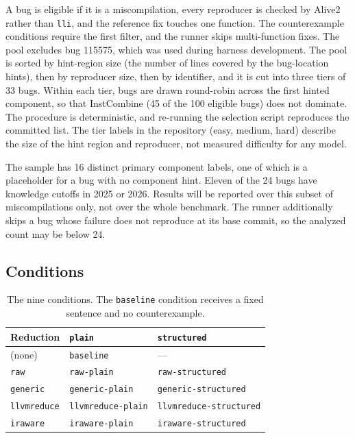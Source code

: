 \documentclass[conference]{IEEEtran}
\newcommand{\cn}[1]{\texttt{#1}}   %
\begin{document}
A bug is eligible if it is a miscompilation, every reproducer is checked by Alive2 rather than \texttt{lli}, and the reference fix touches one function. The counterexample conditions require the first filter, and the runner skips multi-function fixes. The pool excludes bug 115575, which was used during harness development. The pool is sorted by hint-region size (the number of lines covered by the bug-location hints), then by reproducer size, then by identifier, and it is cut into three tiers of 33 bugs. Within each tier, bugs are drawn round-robin across the first hinted component, so that InstCombine (45 of the 100 eligible bugs) does not dominate. The procedure is deterministic, and re-running the selection script reproduces the committed list. The tier labels in the repository (easy, medium, hard) describe the size of the hint region and reproducer, not measured difficulty for any model.

The sample has 16 distinct primary component labels, one of which is a placeholder for a bug with no component hint. Eleven of the 24 bugs have knowledge cutoffs in 2025 or 2026. Results will be reported over this subset of miscompilations only, not over the whole benchmark. The runner additionally skips a bug whose failure does not reproduce at its base commit, so the analyzed count may be below 24.

\subsection{Conditions}

\begin{table}[t]
\caption{The nine conditions. The \cn{baseline} condition receives a fixed sentence and no counterexample.}
\label{tab:conditions}
\centering\footnotesize
\begin{tabular}{@{}lll@{}}
\toprule
Reduction & \cn{plain} & \cn{structured} \\
\midrule
(none) & \cn{baseline} & --- \\
\cn{raw} & \cn{raw-plain} & \cn{raw-structured} \\
\cn{generic} & \cn{generic-plain} & \cn{generic-structured} \\
\cn{llvmreduce} & \cn{llvmreduce-plain} & \cn{llvmreduce-structured} \\
\cn{iraware} & \cn{iraware-plain} & \cn{iraware-structured} \\
\bottomrule
\end{tabular}
\end{table}
\end{document}
